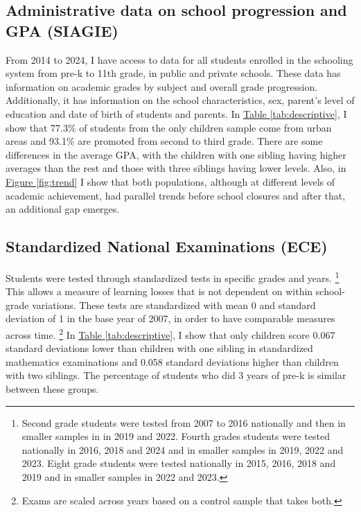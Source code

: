 \subsection{Administrative data on school progression and GPA (SIAGIE)}

From 2014 to 2024, I have access to data for all students enrolled in the schooling system from pre-k to 11th grade, in public and private schools. These data has information on academic grades by subject and overall grade progression. Additionally, it has information on the school characteristics, sex, parent's level of education and date of birth of students and parents. In \hyperref[tab:descriptive]{Table \ref{tab:descriptive}}, I show that 77.3\% of students from the only children sample come from urban areas and 93.1\% are promoted from second to third grade. There are some differences in the average GPA, with the children with one sibling having higher averages than the rest and those with three siblings having lower levels. Also, in \hyperref[fig:trend]{Figure \ref{fig:trend}} I show that both populations, although at different levels of academic achievement, had parallel trends before school closures and after that, an additional gap emerges.

\subsection{Standardized National Examinations (ECE)}

Students were tested through standardized tests in specific grades and years. \footnote{Second grade students were tested from 2007 to 2016 nationally and then in smaller samples in in 2019 and 2022. Fourth grades students were tested nationally in 2016, 2018 and 2024 and in smaller samples in 2019, 2022 and 2023. Eight grade students were tested nationally in 2015, 2016, 2018 and 2019 and in smaller samples in 2022 and 2023.} This allows a measure of learning losses that is not dependent on within school-grade variations. These tests are standardized with mean 0 and standard deviation of 1 in the base year of 2007, in order to have comparable measures across time. \footnote{Exams are scaled across years based on a control sample that takes both.} In \hyperref[tab:descriptive]{Table \ref{tab:descriptive}}, I show that only children score 0.067 standard deviations lower than children with one sibling in standardized mathematics examinations and 0.058 standard deviations higher than children with two siblings. The percentage of students who did 3 years of pre-k is similar between these groups.  

